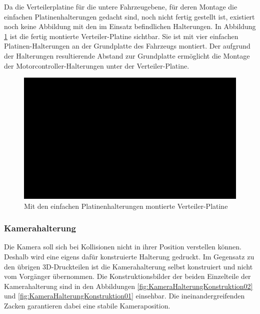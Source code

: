 Da die Verteilerplatine für die untere Fahrzeugebene, für deren Montage die einfachen Platinenhalterungen gedacht sind, noch nicht fertig gestellt ist, existiert noch keine Abbildung mit den im Einsatz befindlichen Halterungen. In Abbildung \ref{fig:PlatinenHalterungenMontage} ist die fertig montierte Verteiler-Platine sichtbar. Sie ist mit vier einfachen Platinen-Halterungen an der Grundplatte des Fahrzeugs montiert. Der aufgrund der Halterungen resultierende Abstand zur Grundplatte ermöglicht die Montage der Motorcontroller-Halterungen unter der Verteiler-Platine.

\begin{figure}[H] %
\includegraphics[width=.9\textwidth]{sec2/images/3DAnbaukomponenten/Montagebilder/PlatinenHalterungenMontage} 
\centering
\captionsetup{width=.95\textwidth}
\caption[Mit den einfachen Platinenhalterungen montierte Verteiler-Platine]{Mit den einfachen Platinenhalterungen montierte Verteiler-Platine}
\centering
\label{fig:PlatinenHalterungenMontage}
\end{figure}

\subsubsection{Kamerahalterung}\label{Sec2Sub2SubSub6}

Die Kamera soll sich bei Kollisionen nicht in ihrer Position verstellen können. Deshalb wird eine eigens dafür konstruierte Halterung gedruckt. Im Gegensatz zu den übrigen 3D-Druckteilen ist die Kamerahalterung selbst konstruiert und nicht vom Vorgänger übernommen. Die Konstruktionsbilder der beiden Einzelteile der Kamerahalterung sind in den Abbildungen \ref{fig:KameraHalterungKonstruktion02} und \ref{fig:KameraHalterungKonstruktion01} einsehbar. Die ineinandergreifenden Zacken garantieren dabei eine stabile Kameraposition.

